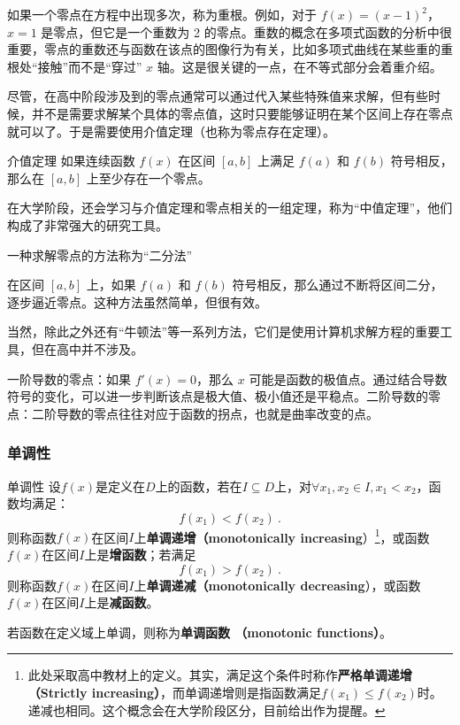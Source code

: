 如果一个零点在方程中出现多次，称为重根。例如，对于 $f(x) = (x - 1)^2$，$x = 1$ 是零点，但它是一个重数为 2 的零点。重数的概念在多项式函数的分析中很重要，零点的重数还与函数在该点的图像行为有关，比如多项式曲线在某些重的重根处“接触”而不是“穿过” $x$ 轴。这是很关键的一点，在不等式部分会着重介绍。

尽管，在高中阶段涉及到的零点通常可以通过代入某些特殊值来求解，但有些时候，并不是需要求解某个具体的零点值，这时只要能够证明在某个区间上存在零点就可以了。于是需要使用介值定理（也称为零点存在定理）。

\begin{definition}{介值定理}
如果连续函数 $f(x)$ 在区间 $[a, b]$ 上满足 $f(a)$ 和 $f(b)$ 符号相反，那么在 $[a, b]$ 上至少存在一个零点。
\end{definition}

在大学阶段，还会学习与介值定理和零点相关的一组定理，称为“中值定理”，他们构成了非常强大的研究工具。

一种求解零点的方法称为“二分法”

在区间 $[a, b]$ 上，如果 $f(a)$ 和 $f(b)$ 符号相反，那么通过不断将区间二分，逐步逼近零点。这种方法虽然简单，但很有效。

当然，除此之外还有“牛顿法”等一系列方法，它们是使用计算机求解方程的重要工具，但在高中并不涉及。


一阶导数的零点：如果 $f'(x) = 0$，那么 $x$ 可能是函数的极值点。通过结合导数符号的变化，可以进一步判断该点是极大值、极小值还是平稳点。二阶导数的零点：二阶导数的零点往往对应于函数的拐点，也就是曲率改变的点。

\subsubsection{单调性}



\begin{definition}{单调性}
设$f(x)$是定义在$D$上的函数，若在$I\subseteq D$上，对$\forall x_1,x_2\in I,x_1< x_2$，函数均满足：
\begin{equation}
f(x_1)<f(x_2)~.
\end{equation}
则称函数$f(x)$在区间$I$上\textbf{单调递增（monotonically increasing}）\footnote{此处采取高中教材上的定义。其实，满足这个条件时称作\textbf{严格单调递增 （Strictly increasing）}，而单调递增则是指函数满足$f(x_1)\leq f(x_2)$时。递减也相同。这个概念会在大学阶段区分，目前给出作为提醒。}，或函数$f(x)$在区间$I$上是\textbf{增函数}；若满足
\begin{equation}
f(x_1)>f(x_2)~.
\end{equation}
则称函数$f(x)$在区间$I$上\textbf{单调递减（monotonically decreasing}），或函数$f(x)$在区间$I$上是\textbf{减函数}。

若函数在定义域上单调，则称为\textbf{单调函数 （monotonic functions）}。
\end{definition}



